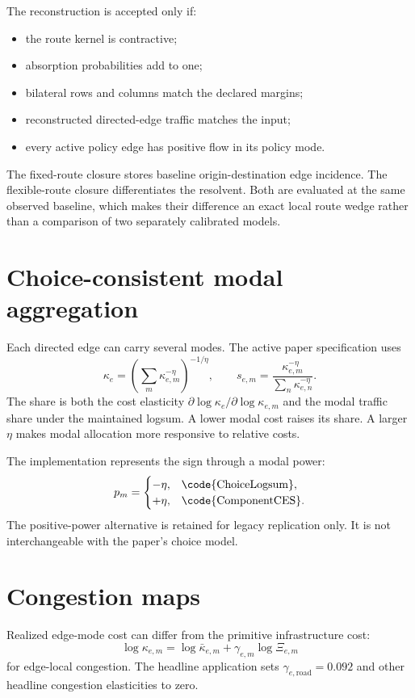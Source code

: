 The reconstruction is accepted only if:
\begin{itemize}
  \item the route kernel is contractive;
  \item absorption probabilities add to one;
  \item bilateral rows and columns match the declared margins;
  \item reconstructed directed-edge traffic matches the input;
  \item every active policy edge has positive flow in its policy mode.
\end{itemize}

The fixed-route closure stores baseline origin-destination edge incidence.
The flexible-route closure differentiates the resolvent. Both are evaluated at
the same observed baseline, which makes their difference an exact local route
wedge rather than a comparison of two separately calibrated models.

\section{Choice-consistent modal aggregation}

Each directed edge can carry several modes. The active paper specification
uses
\[
 \kappa_e
 =\left(\sum_m\kappa_{e,m}^{-\eta}\right)^{-1/\eta},
 \qquad
 s_{e,m}
 =\frac{\kappa_{e,m}^{-\eta}}
        {\sum_n\kappa_{e,n}^{-\eta}}.
\]
The share is both the cost elasticity
\(\partial\log\kappa_e/\partial\log\kappa_{e,m}\) and the modal traffic share
under the maintained logsum. A lower modal cost raises its share. A larger
\(\eta\) makes modal allocation more responsive to relative costs.

The implementation represents the sign through a modal power:
\[
 p_m=
 \begin{cases}
 -\eta,&\text{\code{ChoiceLogsum}},\\
 +\eta,&\text{\code{ComponentCES}}.
 \end{cases}
\]
The positive-power alternative is retained for legacy replication only. It is
not interchangeable with the paper's choice model.

\section{Congestion maps}

Realized edge-mode cost can differ from the primitive infrastructure cost:
\[
 \log\kappa_{e,m}
 =\log\bar\kappa_{e,m}
  +\gamma_{e,m}\log\Xi_{e,m}
\]
for edge-local congestion. The headline application sets
\(\gamma_{e,\mathrm{road}}=0.092\) and other headline congestion elasticities to
zero.


